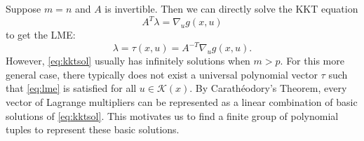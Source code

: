 \documentclass{amsart}
\theoremstyle{plain}
\newcommand{\mc}[1]{\mathcal{#1}}
\numberwithin{equation}{section}
\begin{document}
	Suppose $m=n$ and $A$ is invertible. Then we can directly solve the KKT equation
	\begin{equation}\label{eq:kktsol}
		A^T\lambda = \nabla_u g(x,u)
	\end{equation} to get the LME:
	\begin{equation}\label{eq:plme_sim}
		\lambda = \tau(x,u) = A^{-T}\nabla_u g(x,u).
		\end{equation} 
	However, \eqref{eq:kktsol} usually has infinitely solutions when $m>p$.
    For this more general case, there typically does not exist a universal polynomial vector
     $\tau$ such that \eqref{eq:lme} is satisfied for all $u\in \mc{K}(x)$.
	By Carath\'{e}odory’s Theorem,
	every vector of Lagrange multipliers can be represented as a linear combination of 
	basic solutions of \eqref{eq:kktsol}.
	This motivates us to find a finite group of polynomial tuples to represent these basic solutions.
		
		
	
		
\end{document}
